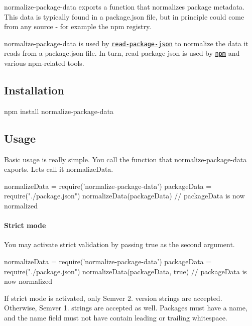 normalize-\/package-\/data exports a function that normalizes package metadata. This data is typically found in a package.\+json file, but in principle could come from any source -\/ for example the npm registry.

normalize-\/package-\/data is used by \href{https://npmjs.org/package/read-package-json}{\tt read-\/package-\/json} to normalize the data it reads from a package.\+json file. In turn, read-\/package-\/json is used by \href{https://npmjs.org/package/npm}{\tt npm} and various npm-\/related tools.

\subsection*{Installation}


\begin{DoxyCode}
npm install normalize-package-data
\end{DoxyCode}


\subsection*{Usage}

Basic usage is really simple. You call the function that normalize-\/package-\/data exports. Let\textquotesingle{}s call it {\ttfamily normalize\+Data}.


\begin{DoxyCode}
normalizeData = require('normalize-package-data')
packageData = require("./package.json")
normalizeData(packageData)
// packageData is now normalized
\end{DoxyCode}


\paragraph*{Strict mode}

You may activate strict validation by passing true as the second argument.


\begin{DoxyCode}
normalizeData = require('normalize-package-data')
packageData = require("./package.json")
normalizeData(packageData, true)
// packageData is now normalized
\end{DoxyCode}


If strict mode is activated, only Semver 2. version strings are accepted. Otherwise, Semver 1. strings are accepted as well. Packages must have a name, and the name field must not have contain leading or trailing whitespace.

